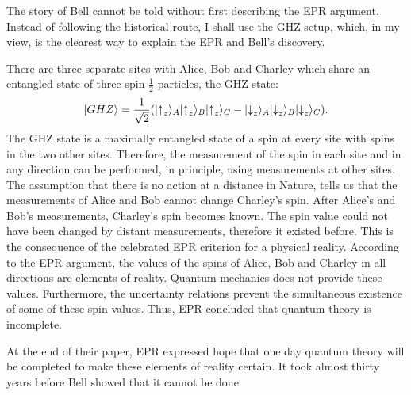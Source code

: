 \documentclass[11pt]{article}
\begin{document}
The story of Bell cannot be told without first describing the EPR argument. Instead of following the historical route,   I shall use the GHZ setup, which, in my view, is the clearest way to explain the EPR and Bell's discovery.

There are three separate sites with Alice, Bob and Charley which share an entangled state of three spin-$\frac{1}{2}$ particles, the GHZ state:
\begin{equation}
\label{GHZ}
|GHZ\rangle = {1\over \sqrt
  2}{\Large (}|{\uparrow}_z\rangle_A|{\uparrow}_z\rangle_B|{\uparrow}_z\rangle_C -
|{\downarrow}_z\rangle_A|{\downarrow}_z\rangle_B|{\downarrow}_z\rangle_C{\Large
)} .
\end{equation}
The GHZ state is a maximally entangled state of a spin at every site with spins in the two other sites. Therefore, the measurement of the spin in each site and in any direction can be performed, in principle, using measurements at other sites. The assumption that there is no action at a distance in Nature, tells us that the measurements of Alice and Bob cannot change Charley's spin. After Alice's and Bob's measurements,  Charley's spin becomes known. The spin value could not have been changed by distant measurements, therefore it existed before. This is the consequence of the celebrated EPR criterion for a physical reality. According to the EPR argument, the values of the spins of Alice, Bob and Charley in all directions  are elements of reality. Quantum mechanics does not provide these values. Furthermore, the uncertainty relations prevent the simultaneous existence of some of these spin values. Thus, EPR concluded that quantum theory is incomplete.

 At the end of their paper, EPR expressed hope that one day quantum theory will be completed to make these elements of reality certain. It took almost thirty years before Bell showed that it cannot be done.
\end{document}
